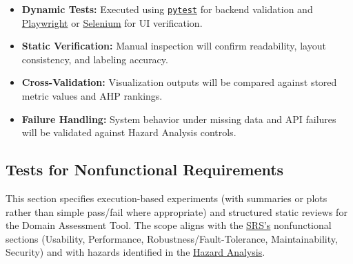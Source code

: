 \documentclass[12pt, titlepage]{article}
\begin{document}
\begin{itemize}
  \item \textbf{Dynamic Tests:} Executed using \texttt{\href{https://docs.pytest.org/en/stable/}{pytest}} for backend validation and \href{https://playwright.dev/}{Playwright} or \href{https://www.selenium.dev/}{Selenium} for UI verification.
  \item \textbf{Static Verification:} Manual inspection will confirm readability, layout consistency, and labeling accuracy.
  \item \textbf{Cross-Validation:} Visualization outputs will be compared against stored metric values and AHP rankings.
  \item \textbf{Failure Handling:} System behavior under missing data and API failures will be validated against Hazard Analysis controls.
\end{itemize}

\subsection{Tests for Nonfunctional Requirements}





\label{sec:nfr-tests}

This section specifies execution-based experiments (with summaries or plots rather than simple pass/fail where appropriate) and structured static reviews for the Domain Assessment Tool. The scope aligns with the \href{https://github.com/thaafei/DomainX/blob/main/docs/SRS/SRS.pdf}{SRS’s} nonfunctional sections (Usability, Performance, Robustness/Fault-Tolerance, Maintainability, Security) and with hazards identified in the \href{https://github.com/thaafei/DomainX/blob/main/docs/HazardAnalysis/HazardAnalysis.pdf}{Hazard Analysis}.
\end{document}
